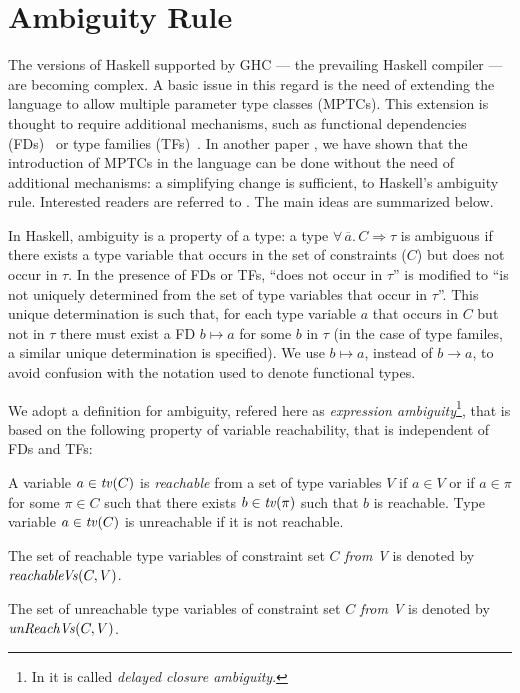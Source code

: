 \section{Ambiguity Rule}
\label{sec:ambiguity}

The versions of Haskell supported by GHC \cite{GHC} --- the prevailing
Haskell compiler --- are becoming complex. A basic issue in this
regard is the need of extending the language to allow multiple
parameter type classes (MPTCs). This extension is thought to require
additional mechanisms, such as functional dependencies
(FDs)~\cite{Jones2008} or type families
(TFs)~\cite{Chakravarty2005}. In another paper
\cite{JBCS-Ambiguity-and-constrained-polymorphism}, we have shown that
the introduction of MPTCs in the language can be done without the need
of additional mechanisms: a simplifying change is sufficient, to
Haskell's ambiguity rule. Interested readers are referred to
\cite{JBCS-Ambiguity-and-constrained-polymorphism}. The main ideas are
summarized below.

In Haskell, ambiguity is a property of a type: a type
$\forall\,\overline{a}.\,C \Rightarrow \tau$ is ambiguous if there
exists a type variable that occurs in the set of constraints ($C$) but
does not occur in $\tau$.  In the presence of FDs or TFs, ``does not
occur in $\tau$'' is modified to ``is not uniquely determined from the
set of type variables that occur in $\tau$''. This unique
determination is such that, for each type variable $a$ that occurs in
$C$ but not in $\tau$ there must exist a FD $b \mapsto a$ for some $b$
in $\tau$ (in the case of type familes, a similar unique determination
is specified). We use $b \mapsto a$, instead of $b \rightarrow a$, to
avoid confusion with the notation used to denote functional types.

We adopt a definition for ambiguity, refered here as {\em expression
  ambiguity\/}\footnote{In
  \cite{JBCS-Ambiguity-and-constrained-polymorphism} it is called {\em
    delayed closure ambiguity\/}.}, that is based on the following
property of variable reachability, that is independent of FDs and TFs:

\begin{Definition}

A variable $a\in {\it tv\/}(C)$ is {\em reachable} from a set of type
variables $V$ if $a\in V$ or if $a\in \pi$ for some $\pi\in C$ such
that there exists $b\in {\it tv\/}(\pi)$ such that $b$ is reachable. Type
variable $a\in {\it tv\/}(C)$ is unreachable if it is not reachable.

The set of reachable type variables of constraint set $C$ {\em from
  V\/} is denoted by ${\it reachableVs\/}(C,V)$.

The set of unreachable type variables of constraint set $C$ {\em from
  V\/} is denoted by $\text{\it unReachVs\/}(C,V)$.

\label{def:reachable}
\end{Definition}

